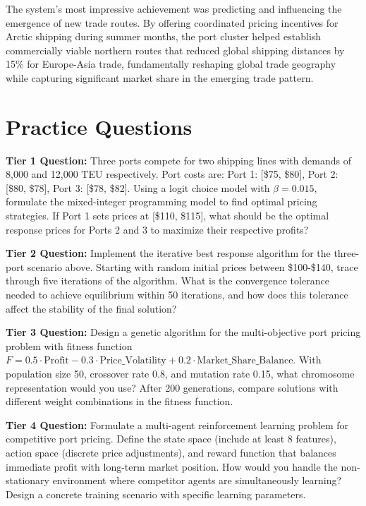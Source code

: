 \documentclass{article}
\begin{document}
The system's most impressive achievement was predicting and influencing the emergence of new trade routes. By offering coordinated pricing incentives for Arctic shipping during summer months, the port cluster helped establish commercially viable northern routes that reduced global shipping distances by 15\% for Europe-Asia trade, fundamentally reshaping global trade geography while capturing significant market share in the emerging trade pattern.

\section{Practice Questions}

\textbf{Tier 1 Question:} Three ports compete for two shipping lines with demands of 8,000 and 12,000 TEU respectively. Port costs are: Port 1: [\$75, \$80], Port 2: [\$80, \$78], Port 3: [\$78, \$82]. Using a logit choice model with $\beta = 0.015$, formulate the mixed-integer programming model to find optimal pricing strategies. If Port 1 sets prices at [\$110, \$115], what should be the optimal response prices for Ports 2 and 3 to maximize their respective profits?

\textbf{Tier 2 Question:} Implement the iterative best response algorithm for the three-port scenario above. Starting with random initial prices between \$100-\$140, trace through five iterations of the algorithm. What is the convergence tolerance needed to achieve equilibrium within 50 iterations, and how does this tolerance affect the stability of the final solution?

\textbf{Tier 3 Question:} Design a genetic algorithm for the multi-objective port pricing problem with fitness function $F = 0.5 \cdot \text{Profit} - 0.3 \cdot \text{Price\_Volatility} + 0.2 \cdot \text{Market\_Share\_Balance}$. With population size 50, crossover rate 0.8, and mutation rate 0.15, what chromosome representation would you use? After 200 generations, compare solutions with different weight combinations in the fitness function.

\textbf{Tier 4 Question:} Formulate a multi-agent reinforcement learning problem for competitive port pricing. Define the state space (include at least 8 features), action space (discrete price adjustments), and reward function that balances immediate profit with long-term market position. How would you handle the non-stationary environment where competitor agents are simultaneously learning? Design a concrete training scenario with specific learning parameters.
\end{document}
